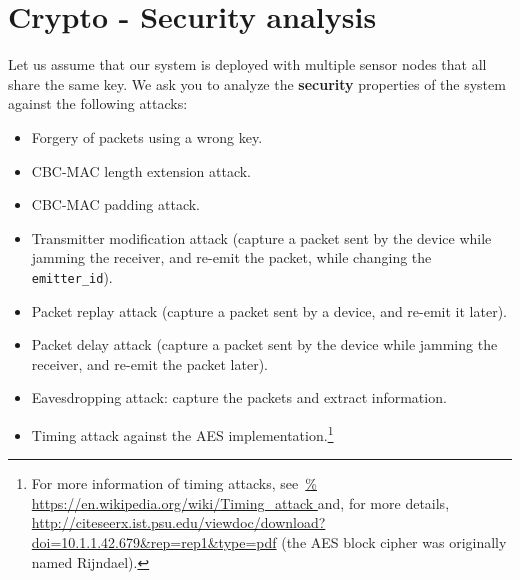 \newpage
\section{Crypto - Security analysis}
Let us assume that our system is deployed with multiple sensor nodes that all
share the same key.
We ask you to analyze the \textbf{security} properties of the system against the
following attacks:
\begin{itemize}
    \item Forgery of packets using a wrong key.
    \item CBC-MAC length extension attack.
    \item CBC-MAC padding attack.
    \item Transmitter modification attack (capture a packet sent by the device
        while jamming the receiver, and re-emit the packet, while changing the
        \texttt{emitter\_id}).
    \item Packet replay attack (capture a packet sent by a device, and re-emit
        it later).
    \item Packet delay attack (capture a packet sent by the device while
        jamming the receiver, and re-emit the packet later).
    \item Eavesdropping attack: capture the packets and extract information.
    \item Timing attack against the AES implementation.\footnote{%
            For more information of timing attacks, see~\url{%
                https://en.wikipedia.org/wiki/Timing_attack
            } and, for more details,
            \url{http://citeseerx.ist.psu.edu/viewdoc/download?doi=10.1.1.42.679&rep=rep1&type=pdf}
            (the AES block cipher was originally named Rijndael).
        }
\end{itemize}

